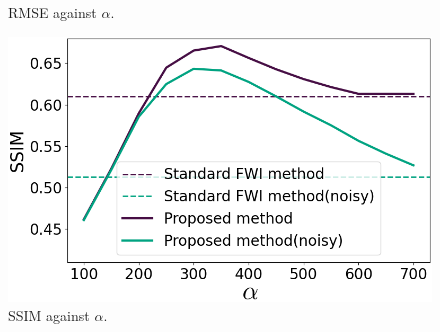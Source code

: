 \begin{figure}[htbp]
\begin{minipage}{58mm}
        \caption{RMSE against $\alpha$.}
        \label{fig:alpha-rmse}
    \end{minipage}
    \hspace{-2mm}
    \begin{minipage}{58mm}
        \centering
        \includegraphics[width=\linewidth]{public/alpha-ssim-colored}
        \caption{SSIM against $\alpha$.}
        \label{fig:alpha-ssim}
        \vspace{3mm}
    \end{minipage}
\end{figure}

